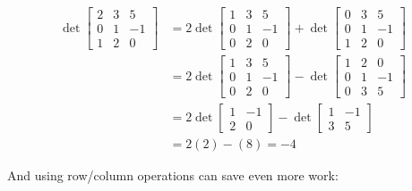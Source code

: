 \begin{applicationActivities}{2}{26}
\begin{observation}
  \begin{align*}
    \det \begin{bmatrix} 2 & 3 & 5  \\ 0 & 1 & -1  \\ 1 & 2 & 0  \end{bmatrix}
  &=
    2\det \begin{bmatrix} 1 & 3 & 5 \\ 0 & 1 & -1 \\ 0 & 2 & 0 \end{bmatrix}
    +\det \begin{bmatrix} 0 & 3 & 5  \\ 0 & 1 & -1  \\ 1 & 2 & 0  \end{bmatrix}
  \\ &=
    2\det \begin{bmatrix} 1 & 3 & 5 \\ 0 & 1 & -1 \\ 0 & 2 & 0 \end{bmatrix}
    -\det \begin{bmatrix} 1 & 2 & 0  \\ 0 & 1 & -1  \\  0 & 3 & 5 \end{bmatrix}
  \\ &=
    2\det \begin{bmatrix}  1 & -1 \\  2 & 0 \end{bmatrix}
    -\det \begin{bmatrix}  1 & -1 \\ 3 & 5 \end{bmatrix}
  \\ &=
    2(2)-(8)=-4
  \end{align*}
\end{observation}

\begin{observation}
And using row/column operations can save even more work:


\end{observation}
\end{applicationActivities}
